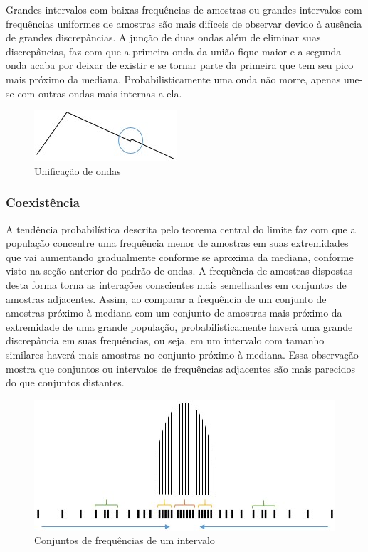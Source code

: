 Grandes intervalos com baixas frequências de amostras ou grandes intervalos com frequências uniformes de amostras são mais difíceis de observar devido à ausência de grandes discrepâncias. A junção de duas ondas além de eliminar suas discrepâncias, faz com que a primeira onda da união fique maior e a segunda onda acaba por deixar de existir e se tornar parte da primeira que tem seu pico mais próximo da mediana. Probabilisticamente uma onda não morre, apenas une-se com outras ondas mais internas a ela.

\begin{figure}[H]
\caption{Unificação de ondas}
\label{fig:consciousness_uniform_wave}
\centering
\includegraphics[scale=1]{sections/images/consciousness_uniform_wave.jpg}
\end{figure}

\subsubsection{Coexistência}
A tendência probabilística descrita pelo teorema central do limite faz com que a população concentre uma frequência menor de amostras em suas extremidades que vai aumentando gradualmente conforme se aproxima da mediana, conforme visto na seção anterior do padrão de ondas. A frequência de amostras dispostas desta forma torna as interações conscientes mais semelhantes em conjuntos de amostras adjacentes. Assim, ao comparar a frequência de um conjunto de amostras próximo à mediana com um conjunto de amostras mais próximo da extremidade de uma grande população, probabilisticamente haverá uma grande discrepância em suas frequências, ou seja, em um intervalo com tamanho similares haverá mais amostras no conjunto próximo à mediana. Essa observação mostra que conjuntos ou intervalos de frequências adjacentes são mais parecidos do que conjuntos distantes.

\begin{figure}[H]
\caption{Conjuntos de frequências de um intervalo}
\label{fig:consciousness_coexistence}
\centering
\includegraphics[scale=1]{sections/images/consciousness_coexistence.jpg}
\end{figure}

